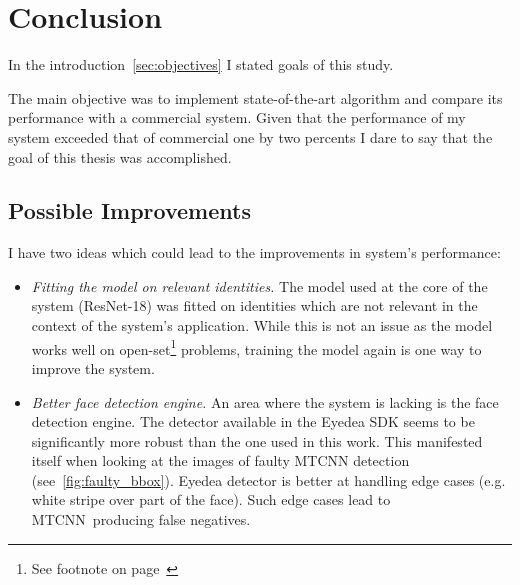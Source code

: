 \chapter{Conclusion}\label{ch:conclusion}
In the introduction~\ref{sec:objectives} I stated goals of this study.

The main objective was to implement state-of-the-art algorithm and compare its performance with a commercial system.
Given that the performance of my system exceeded that of commercial one by two percents I dare to say that the
goal of this thesis was accomplished.

\section{Possible Improvements}\label{sec:possible-improvements}
I have two ideas which could lead to the improvements in system's performance:
\begin{itemize}
    \item \textit{Fitting the model on relevant identities.} The model used at the core of the system (ResNet-18) was
    fitted on identities which are not relevant in the context of the system's application.
    While this is not an issue as the model works well on open-set\footnote{See footnote on page~\pageref{foot:openset}}
    problems, training the model again is one way to improve the system.
    \item \textit{Better face detection engine.} An area where the system is lacking is the face detection engine.
    The detector available in the Eyedea SDK seems to be significantly more robust than the one used in this work.
    This manifested itself when looking at the images of faulty MTCNN detection (see~\ref{fig:faulty_bbox}).
    Eyedea detector is better at handling edge cases (e.g. white stripe over part of the face).
    Such edge cases lead to MTCNN producing false negatives.
\end{itemize}
